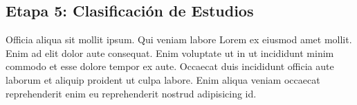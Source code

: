 \subsection{Etapa 5: Clasificación de Estudios}\label{sec:clasificacion-estudios}
Officia aliqua sit mollit ipsum. Qui veniam labore Lorem ex eiusmod amet mollit. Enim ad elit dolor aute consequat. Enim voluptate ut in ut incididunt minim commodo et esse dolore tempor ex aute. Occaecat duis incididunt officia aute laborum et aliquip proident ut culpa labore. Enim aliqua veniam occaecat reprehenderit enim eu reprehenderit nostrud adipisicing id.
